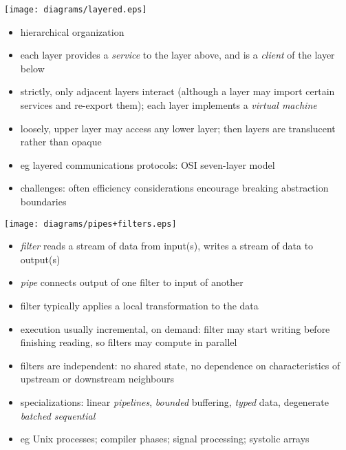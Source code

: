 \documentclass{sepslide-soa-faked} %
\begin{document}
\begin{slide}
\begin{center}
\texttt{[image: diagrams/layered.eps]}
\end{center}
\end{slide}
\begin{slide}
  \begin{itemize}
  \item hierarchical organization
  \item each layer provides a \emph{service} to the layer above, and is a
    \emph{client} of the layer below
  \item strictly, only adjacent layers interact (although a layer
    may import certain services and re-export them); each layer
    implements a \emph{virtual machine}
  \item loosely, upper layer may access any lower layer; then layers
    are translucent rather than opaque
  \item eg layered communications protocols: OSI seven-layer model
  \item challenges: often efficiency considerations encourage breaking
    abstraction boundaries
  \end{itemize}
\end{slide}

\begin{slide}
\begin{center}
\texttt{[image: diagrams/pipes+filters.eps]}
\end{center}
  \begin{itemize}
  \item \emph{filter} reads a stream of data from input(s), writes a stream
    of data to output(s)
  \item \emph{pipe} connects output of one filter to input of another
  \end{itemize}
\end{slide}
\begin{slide}
  \begin{itemize}
  \item filter typically applies a local transformation to the data
  \item execution usually incremental, on demand: filter may start
    writing before finishing reading, so filters may compute in
    parallel
  \item filters are independent: no shared state, no dependence on
    characteristics of upstream or downstream neighbours
  \item specializations: linear \emph{pipelines}, \emph{bounded}
    buffering, \emph{typed} data, degenerate \emph{batched sequential}
  \item eg Unix processes; compiler phases; signal processing;
    systolic arrays
  \end{itemize}
\end{slide}
\end{document}
